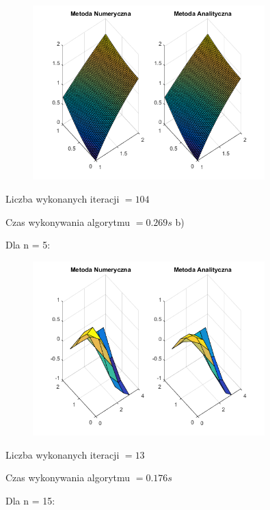 \begin{figure}[!ht]
	\begin{center}
		\includegraphics[width=0.8\textwidth]{Lab6/charts/young/zad1/50.png}
	\end{center}
\end{figure}

Liczba wykonanych iteracji $ = 104 $

Czas wykonywania algorytmu $ = 0.269 s$
\newpage
b)

Dla n = 5:

\begin{figure}[!ht]
	\begin{center}
		\includegraphics[width=0.8\textwidth]{Lab6/charts/young/zad2/5.png}
	\end{center}
\end{figure}

Liczba wykonanych iteracji $ = 13 $

Czas wykonywania algorytmu $ = 0.176 s$

Dla n = 15:

